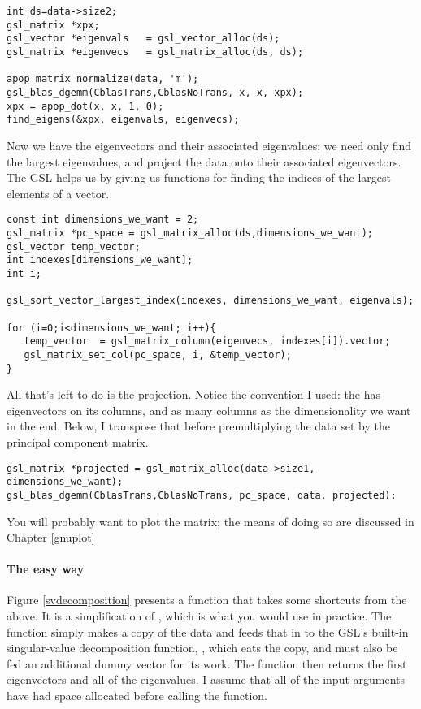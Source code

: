 \begin{lstlisting}
int ds=data->size2;
gsl_matrix *xpx;
gsl_vector *eigenvals   = gsl_vector_alloc(ds);
gsl_matrix *eigenvecs   = gsl_matrix_alloc(ds, ds);

apop_matrix_normalize(data, 'm');
gsl_blas_dgemm(CblasTrans,CblasNoTrans, x, x, xpx);
xpx = apop_dot(x, x, 1, 0);
find_eigens(&xpx, eigenvals, eigenvecs);
\end{lstlisting}

Now we have the eigenvectors and their associated eigenvalues; we need only find
the largest eigenvalues, and project the data onto their associated eigenvectors.
The GSL helps us by giving us functions for
finding the indices of the largest elements of a vector.
\begin{lstlisting}
const int dimensions_we_want = 2;
gsl_matrix *pc_space = gsl_matrix_alloc(ds,dimensions_we_want);
gsl_vector temp_vector;
int indexes[dimensions_we_want];
int i;

gsl_sort_vector_largest_index(indexes, dimensions_we_want, eigenvals);

for (i=0;i<dimensions_we_want; i++){
   temp_vector  = gsl_matrix_column(eigenvecs, indexes[i]).vector;
   gsl_matrix_set_col(pc_space, i, &temp_vector);
}
\end{lstlisting}

All that's left to do is the projection. Notice the convention I used:
the  has eigenvectors on its columns, and as many columns as the
dimensionality we want in the end. Below, I transpose that before premultiplying
the data set by the principal component matrix.

\begin{lstlisting}
gsl_matrix *projected = gsl_matrix_alloc(data->size1, dimensions_we_want);
gsl_blas_dgemm(CblasTrans,CblasNoTrans, pc_space, data, projected);
\end{lstlisting}

You will probably want to plot the  matrix; the means
of doing so are discussed in Chapter \ref{gnuplot}

\paragraph{The easy way}

Figure \ref{svdecomposition} presents a function that takes some
shortcuts from the above. It is a
simplification of , which is what you would use in practice. The function simply makes
a copy of the data and feeds that in to the GSL's built-in singular-value
decomposition function, , which eats the copy, and must also be fed an
additional dummy vector for its work. The function then returns the first
 eigenvectors and all of the eigenvalues. I
assume that all of the input arguments have had space allocated before
calling the function.  

